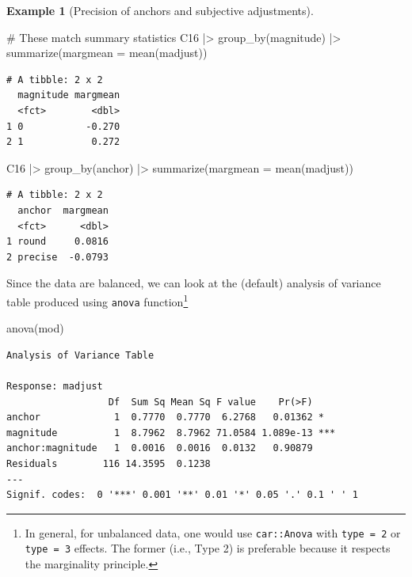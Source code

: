 \documentclass[
  11pt,
  letterpaper,
]{scrbook}
\newenvironment{Shaded}{\begin{snugshade}}{\end{snugshade}}
\newcommand{\AttributeTok}[1]{\textcolor[rgb]{0.40,0.45,0.13}{#1}}
\newcommand{\CommentTok}[1]{\textcolor[rgb]{0.37,0.37,0.37}{#1}}
\newcommand{\FunctionTok}[1]{\textcolor[rgb]{0.28,0.35,0.67}{#1}}
\newcommand{\NormalTok}[1]{\textcolor[rgb]{0.00,0.23,0.31}{#1}}
\newcommand{\SpecialCharTok}[1]{\textcolor[rgb]{0.37,0.37,0.37}{#1}}
\theoremstyle{definition}
\theoremstyle{definition}
\newtheorem{example}{Example}[chapter]
\theoremstyle{remark}
\begin{document}
\begin{example}[Precision of anchors and subjective
adjustments]
\begin{Shaded}
\begin{Highlighting}[]
\CommentTok{\# These match summary statistics}
\NormalTok{C16 }\SpecialCharTok{|\textgreater{}}
  \FunctionTok{group\_by}\NormalTok{(magnitude) }\SpecialCharTok{|\textgreater{}}
  \FunctionTok{summarize}\NormalTok{(}\AttributeTok{margmean =} \FunctionTok{mean}\NormalTok{(madjust))}
\end{Highlighting}
\end{Shaded}

\begin{verbatim}
# A tibble: 2 x 2
  magnitude margmean
  <fct>        <dbl>
1 0           -0.270
2 1            0.272
\end{verbatim}

\begin{Shaded}
\begin{Highlighting}[]
\NormalTok{C16 }\SpecialCharTok{|\textgreater{}}
  \FunctionTok{group\_by}\NormalTok{(anchor) }\SpecialCharTok{|\textgreater{}}
  \FunctionTok{summarize}\NormalTok{(}\AttributeTok{margmean =} \FunctionTok{mean}\NormalTok{(madjust))}
\end{Highlighting}
\end{Shaded}

\begin{verbatim}
# A tibble: 2 x 2
  anchor  margmean
  <fct>      <dbl>
1 round     0.0816
2 precise  -0.0793
\end{verbatim}

Since the data are balanced, we can look at the (default) analysis of
variance table produced using \texttt{anova} function\footnote{In
  general, for unbalanced data, one would use \texttt{car::Anova} with
  \texttt{type\ =\ 2} or \texttt{type\ =\ 3} effects. The former (i.e.,
  Type 2) is preferable because it respects the marginality principle.}

\begin{Shaded}
\begin{Highlighting}[]
\FunctionTok{anova}\NormalTok{(mod)}
\end{Highlighting}
\end{Shaded}

\begin{verbatim}
Analysis of Variance Table

Response: madjust
                  Df  Sum Sq Mean Sq F value    Pr(>F)    
anchor             1  0.7770  0.7770  6.2768   0.01362 *  
magnitude          1  8.7962  8.7962 71.0584 1.089e-13 ***
anchor:magnitude   1  0.0016  0.0016  0.0132   0.90879    
Residuals        116 14.3595  0.1238                      
---
Signif. codes:  0 '***' 0.001 '**' 0.01 '*' 0.05 '.' 0.1 ' ' 1
\end{verbatim}


\end{example}
\end{document}
